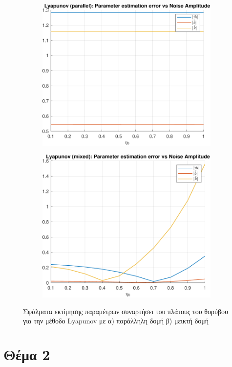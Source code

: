 \documentclass[a4paper,12pt]{article}
\begin{document}
\begin{figure}[h!]
    \centering
    \begin{subfigure}{0.45\textwidth}
        \centering
        \includegraphics[width=\linewidth]{
        plot/task1_estimation_parameter_error_vs_noise_amplitude_lyapunov_parallel.pdf}
        \caption{}
        \label{fig:task1_estimation_parameter_error_vs_noise_amplitude_lyapunov_parallel}
    \end{subfigure}
    \hfill
    \begin{subfigure}{0.45\textwidth}
        \centering
        \includegraphics[width=\linewidth]{
        plot/task1_estimation_parameter_error_vs_noise_amplitude_lyapunov_mixed.pdf}
        \caption{}
        \label{fig:task1_estimation_parameter_error_vs_noise_amplitude_lyapunov_mixed}
    \end{subfigure}
    \caption{Σφάλματα εκτίμησης παραμέτρων συναρτήσει του πλάτους του θορύβου για την μέθοδο
    Lyapunov με 
    α) παράλληλη δομή β) μεικτή δομή}
    \label{fig:task1_estimation_parameter_error_vs_noise_amplitude_lyapunov}
\end{figure}

\section*{Θέμα 2}
\end{document}
